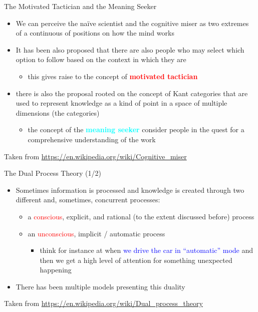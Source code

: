 \documentclass{beamer}
\begin{document}
\begin{frame}
{\centerline{The Motivated Tactician and the Meaning Seeker}}
\begin{itemize}
    \item We can perceive the na\"{i}ve scientist and the cognitive miser as two extremes of a continuous of positions on how the mind works
   \item It has been also proposed that there are also people who may select which option to follow based on the context in which they are
   \begin{itemize}
   \item this gives raise to the concept of \textcolor{red}{\bf motivated tactician}
   \end{itemize} 
   \item there is also the proposal rooted on the concept of Kant categories that are used to represent knowledge as a kind of point in a space of multiple dimensions (the categories)
   \begin{itemize}
   \item the concept of the \textcolor{cyan}{\bf meaning seeker} consider people in the quest for a comprehensive understanding of the work
\end{itemize} 
\end{itemize} 
\begin{center}
    \tiny{Taken from \url{https://en.wikipedia.org/wiki/Cognitive_miser}}
\end{center}

\end{frame}

\begin{frame}
{\centerline{The Dual Process Theory (1/2)}}
\begin{itemize}
    \item Sometimes information is processed and knowledge is created through two different and, sometimes, concurrent processes:
    \begin{itemize}
   \item a \textcolor{red}{conscious}, explicit, and rational (to the extent discussed before) process
   \item an \textcolor{red}{unconscious}, implicit / automatic process
       \begin{itemize}
   \item think for instance at when \textcolor{blue}{we drive the car in ``automatic'' mode} and then we get a high level of attention for something unexpected happening
   \end{itemize} 
      \end{itemize} 
         \item There has been multiple models presenting this duality
   \end{itemize} 
\begin{center}
    \tiny{Taken from \url{https://en.wikipedia.org/wiki/Dual_process_theory}}
\end{center}

\end{frame}
\end{document}
